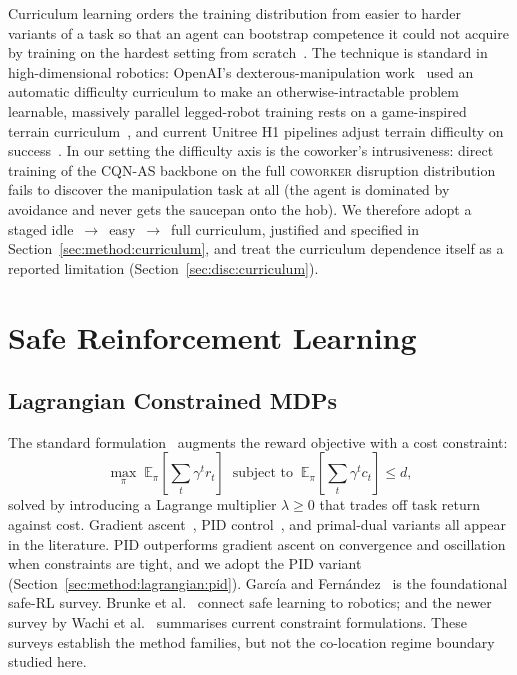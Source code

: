 \documentclass[11pt,a4paper]{report}
\newcommand{\cqnas}{CQN-AS}
\newcommand{\coworker}{\textsc{coworker}}
\begin{document}
Curriculum learning orders the training distribution from easier to
harder variants of a task so that an agent can bootstrap competence
it could not acquire by training on the hardest setting from
scratch~\cite{narvekar2020curriculum}. The technique is standard in
high-dimensional robotics: OpenAI's dexterous-manipulation
work~\cite{openai2019solving} used an automatic difficulty
curriculum to make an otherwise-intractable problem learnable,
massively parallel legged-robot training rests on a game-inspired
terrain curriculum~\cite{rudin2022walkminutes}, and current Unitree
H1 pipelines adjust terrain difficulty on
success~\cite{zhuang2024parkour}. In
our setting the difficulty axis is the coworker's intrusiveness:
direct training of the \cqnas{} backbone on the full
\coworker{} disruption distribution fails to discover the
manipulation task at all (the agent is dominated by avoidance and
never gets the saucepan onto the hob). We therefore adopt a staged
idle~$\rightarrow$~easy~$\rightarrow$~full curriculum, justified and
specified in Section~\ref{sec:method:curriculum}, and treat the
curriculum dependence itself as a reported limitation
(Section~\ref{sec:disc:curriculum}).

\section{Safe Reinforcement Learning}
\label{sec:bg:safe}

\subsection{Lagrangian Constrained MDPs}
\label{sec:bg:safe:lagr}

The standard formulation~\cite{altman1999constrained,
ray2019safetygym} augments the reward objective with a cost
constraint:
\begin{equation}
  \max_{\pi} \;\mathbb{E}_{\pi}\!\left[\sum_t \gamma^t r_t\right]
  \;\;\text{subject to}\;\;
  \mathbb{E}_{\pi}\!\left[\sum_t \gamma^t c_t\right] \le d,
  \label{eq:cmdp}
\end{equation}
solved by introducing a Lagrange multiplier $\lambda \ge 0$ that
trades off task return against cost. Gradient
ascent~\cite{ray2019safetygym,achiam2017cpo}, PID
control~\cite{stooke2020pid}, and primal-dual variants all appear in
the literature. PID outperforms gradient ascent on convergence and
oscillation when constraints are tight, and we adopt the PID variant
(Section~\ref{sec:method:lagrangian:pid}). García and
Fernández~\cite{garcia2015comprehensive} is the foundational safe-RL
survey. Brunke et al.~\cite{brunke2022safelearning} connect safe
learning to robotics; and the newer survey by Wachi et
al.~\cite{wachi2024constraint} summarises current constraint
formulations. These surveys establish the method families, but not the
co-location regime boundary studied here.
\end{document}
